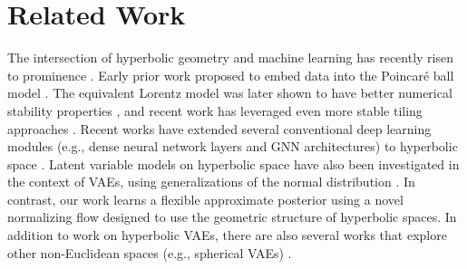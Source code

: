 \section{Related Work}
The intersection of hyperbolic geometry and machine learning has recently risen to prominence \cite{dhingra2018embedding,tay2018hyperbolic,law2019lorentzian,khrulkov2019hyperbolic,ovinnikov2019poincar}. Early prior work proposed to embed data into the Poincar\'e ball model \cite{nickel2017poincare,chamberlain2017neural}.
The equivalent Lorentz model was later shown to have better numerical stability properties \cite{nickel2018learning}, and recent work has leveraged even more stable tiling approaches \cite{yu2019numerically}. 
Recent works have extended several conventional deep learning modules (e.g., dense neural network layers and GNN architectures) to hyperbolic space \cite{gulcehre2018hyperbolic,ganea2018hyperbolic, chami2019hyperbolic}.
Latent variable models on hyperbolic space have also been investigated in the context of VAEs, using  generalizations of the normal distribution \cite{nagano2019wrapped,mathieu2019continuous}. In contrast, our work learns a flexible approximate posterior using a novel normalizing flow designed to use the geometric structure of hyperbolic spaces.
In addition to work on hyperbolic VAEs, there are also several works that explore other non-Euclidean spaces (e.g., spherical VAEs) \cite{davidson2018hyperspherical,falorsi2019reparameterizing,grattarola2019adversarial}.

